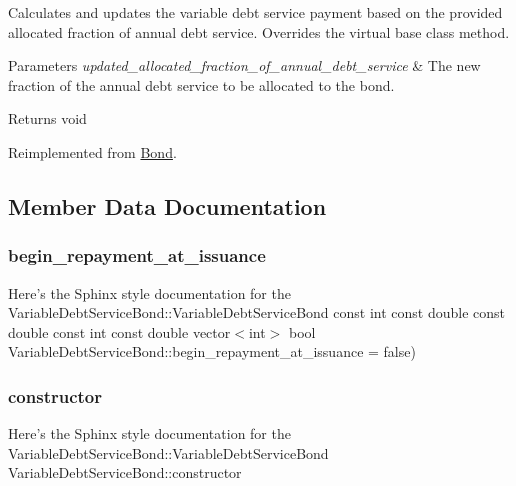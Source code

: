 Calculates and updates the variable debt service payment based on the provided allocated fraction of annual debt service. Overrides the virtual base class method. 


\begin{DoxyParams}{Parameters}
{\em updated\+\_\+allocated\+\_\+fraction\+\_\+of\+\_\+annual\+\_\+debt\+\_\+service} & The new fraction of the annual debt service to be allocated to the bond.\\
\hline
\end{DoxyParams}
\begin{DoxyReturn}{Returns}
void 
\end{DoxyReturn}


Reimplemented from \mbox{\hyperlink{classBond_aff7fc4e1edcf199fb592d22c765b854e}{Bond}}.



\subsection{Member Data Documentation}
\mbox{\label{classVariableDebtServiceBond_a24b333de66efd610ef5d94a673250ff9}} 
\subsubsection{\texorpdfstring{begin\+\_\+repayment\+\_\+at\+\_\+issuance}{begin\_repayment\_at\_issuance}}
{\footnotesize\ttfamily Here’s the Sphinx style documentation for the Variable\+Debt\+Service\+Bond\+::\+Variable\+Debt\+Service\+Bond const int const double const double const int const double vector$<$int$>$ bool Variable\+Debt\+Service\+Bond\+::begin\+\_\+repayment\+\_\+at\+\_\+issuance = false)}

\mbox{\label{classVariableDebtServiceBond_a9369eb5b081c45a8608630b3eacae979}} 
\subsubsection{\texorpdfstring{constructor}{constructor}}
{\footnotesize\ttfamily Here’s the Sphinx style documentation for the Variable\+Debt\+Service\+Bond\+::\+Variable\+Debt\+Service\+Bond Variable\+Debt\+Service\+Bond\+::constructor}

